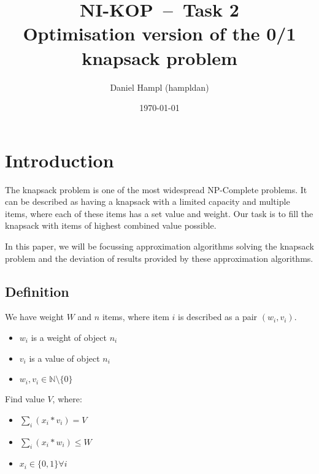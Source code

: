 
\RequirePackage{todonotes}
\RequirePackage[parfill]{parskip}
\RequirePackage[margin=2.8cm]{geometry}
\RequirePackage{hyperref}
\RequirePackage[english]{babel}
\RequirePackage{pgfplots}
\RequirePackage{listings}
\RequirePackage{amsfonts}
\RequirePackage{subfiles}
\RequirePackage{mathtools}

\providecommand{\tightlist}{%
  \setlength{\itemsep}{0pt}\setlength{\parskip}{0pt}}


\title{\textbf{NI-KOP~--~Task 2}\\
    Optimisation version of the 0/1 knapsack problem}
\author{Daniel Hampl (hampldan)}
\date{\today}
\maketitle

\tableofcontents
\newpage

\section{Introduction}
The knapsack problem is one of the most widespread NP-Complete problems. It can be described as having a knapsack with a limited capacity and multiple items, where each of these items has a set value and weight. Our task is to fill the knapsack with items of highest combined value possible.

In this paper, we will be focussing approximation algorithms solving the knapsack problem and the deviation of results provided by these approximation algorithms.

\subsection{Definition\cite{WEBSITE:knapsackDef}}
We have weight $W$ and $n$ items, where item $i$ is described as a pair $(w_i, v_i)$.

\begin{itemize}
    \item $w_i$ is a weight of object $n_i$
    \item $v_i$ is a value of object $n_i$
    \item $w_i, v_i \in \mathbb{N}\setminus\{0\}$
\end{itemize}

Find value $V$, where:

\begin{itemize}
    \item $\sum_i(x_i*v_i) = V$
    \item $\sum_i(x_i*w_i) \leq W$
    \item $x_i \in \{0,1\} \forall i$
\end{itemize}

